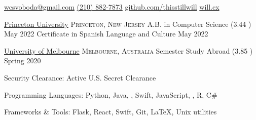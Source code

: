 \documentclass[10pt,letterpaper]{article}
\begin{document}
\sloppy


\nobreakvspace{0.3em}

\noindent\href{mailto:wcsvoboda.at.gmail.dot.com}{wcsvoboda\mbox{}@\mbox{}gmail.com}\sbull
\href{tel:2108827873}{(210) 882-7873}\sbull
\href{https://github.com/thisstillwill}{github.com/thisstillwill}\sbull
\href{https://will.cx}{will.cx}

\spacedhrule{0.9em}{-0.4em}


\headedsection
  {\href{https://www.princeton.edu/}{Princeton University}}
  {\textsc{Princeton, New Jersey}} {%
  \headedsubsection
    {A.B. in Computer Science \textnormal{(3.44 )}}
    {May 2022}
    {}
    \headedsubsection
    {Certificate in Spanish Language and Culture}
    {May 2022}{}
}

\headedsection
  {\href{https://www.unimelb.edu.au/}{University of Melbourne}}
  {\textsc{Melbourne, Australia}} {%
  \headedsubsection
    {Semester Study Abroad \textnormal{(3.85 )}}
    {Spring 2020}{}
}

\spacedhrule{0.5em}{-0.4em}


\inlineheadsection
  {Security Clearance:}
  {Active U.S. Secret Clearance}

\inlineheadsection
  {Programming Languages:}
  {Python, Java, , Swift, JavaScript, , R, C\#}

\inlineheadsection
  {Frameworks \& Tools:}
  {Flask, React, Swift, Git, \LaTeX, Unix utilities}

\end{document}
